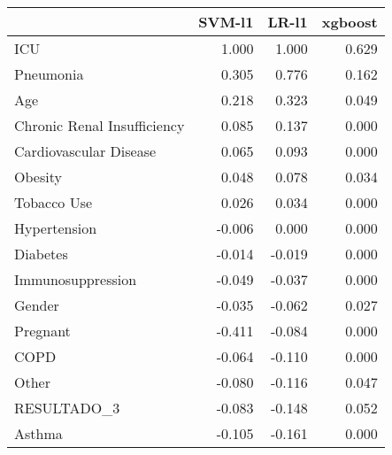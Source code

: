 \begin{tabular}{lrrr}
\toprule
{} &  SVM-l1 &  LR-l1 &  xgboost \\
\midrule
ICU                         &   1.000 &  1.000 &    0.629 \\
Pneumonia                   &   0.305 &  0.776 &    0.162 \\
Age                         &   0.218 &  0.323 &    0.049 \\
Chronic Renal Insufficiency &   0.085 &  0.137 &    0.000 \\
Cardiovascular Disease      &   0.065 &  0.093 &    0.000 \\
Obesity                     &   0.048 &  0.078 &    0.034 \\
Tobacco Use                 &   0.026 &  0.034 &    0.000 \\
Hypertension                &  -0.006 &  0.000 &    0.000 \\
Diabetes                    &  -0.014 & -0.019 &    0.000 \\
Immunosuppression           &  -0.049 & -0.037 &    0.000 \\
Gender                      &  -0.035 & -0.062 &    0.027 \\
Pregnant                    &  -0.411 & -0.084 &    0.000 \\
COPD                        &  -0.064 & -0.110 &    0.000 \\
Other                       &  -0.080 & -0.116 &    0.047 \\
RESULTADO\_3                 &  -0.083 & -0.148 &    0.052 \\
Asthma                      &  -0.105 & -0.161 &    0.000 \\
\bottomrule
\end{tabular}
